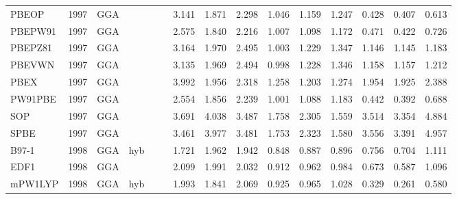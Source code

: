 \begin{landscape}
\begin{longtable}{lcccccrrrrrrrrr}
    PBEOP            & 1997 & GGA  &          &             &           & 3.141             & 1.871             & 2.298  & 1.046              & 1.159             & 1.247  & 0.428   & 0.407 & 0.613 \\
    PBEPW91          & 1997 & GGA  &          &             &           & 2.575             & 1.840             & 2.216  & 1.007              & 1.098             & 1.172  & 0.471   & 0.422 & 0.726 \\
    PBEPZ81          & 1997 & GGA  &          &             &           & 3.164             & 1.970             & 2.495  & 1.003              & 1.229             & 1.347  & 1.146   & 1.145 & 1.183 \\
    PBEVWN           & 1997 & GGA  &          &             &           & 3.135             & 1.969             & 2.494  & 0.998              & 1.228             & 1.346  & 1.158   & 1.157 & 1.212 \\
    PBEX             & 1997 & GGA  &          &             &           & 3.992             & 1.956             & 2.318  & 1.258              & 1.203             & 1.274  & 1.954   & 1.925 & 2.388 \\
    PW91PBE          & 1997 & GGA  &          &             &           & 2.554             & 1.856             & 2.239  & 1.001              & 1.088             & 1.183  & 0.442   & 0.392 & 0.688 \\
    SOP              & 1997 & GGA  &          &             &           & 3.691             & 4.038             & 3.487  & 1.758              & 2.305             & 1.559  & 3.514   & 3.354 & 4.884 \\
    SPBE             & 1997 & GGA  &          &             &           & 3.461             & 3.977             & 3.481  & 1.753              & 2.323             & 1.580  & 3.556   & 3.391 & 4.957 \\
    B97-1            & 1998 & GGA  & hyb      &             &           & 1.721             & 1.962             & 1.942  & 0.848              & 0.887             & 0.896  & 0.756   & 0.704 & 1.111 \\
    EDF1             & 1998 & GGA  &          &             &           & 2.099             & 1.991             & 2.032  & 0.912              & 0.962             & 0.984  & 0.673   & 0.587 & 1.096 \\
    mPW1LYP          & 1998 & GGA  & hyb      &             &           & 1.993             & 1.841             & 2.069  & 0.925              & 0.965             & 1.028  & 0.329   & 0.261 & 0.580 \\

\end{longtable}
\end{landscape}

